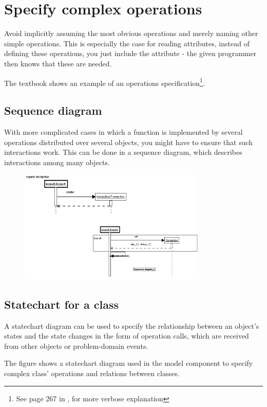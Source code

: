 \section{Specify complex operations}
Avoid implicitly assuming the most obvious operations and merely naming other simple operations. This is especially the case for reading attributes, instead of defining these operations, you just include the attribute - the given programmer then knows that these are needed.

The textbook shows an example of an operations specification\footnote{See page 267 in \ad, for more verbose explanation}. 

\subsection{Sequence diagram}
With more complicated cases in which a function is implemented by several operations distributed over several objects, you might have to ensure that such interactions work. This can be done in a sequence diagram, which describes interactions among many objects.

\begin{figure}[H]
    \centering
    \includegraphics[width=0.8\textwidth]{figures/sequencediagram.png}
\end{figure}

\subsection{Statechart for a class}
A statechart diagram can be used to specify the relationship between an object's states and the state changes in the form of operation calls, which are received from other objects or problem-domain events. 

The figure shows a statechart diagram used in the model component to specify complex class' operations and relations between classes. 


